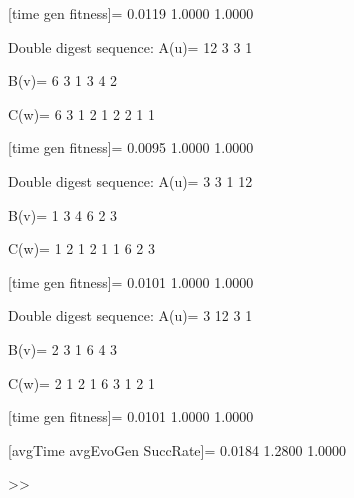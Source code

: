 [time gen fitness]=
    0.0119    1.0000    1.0000

Double digest sequence:
A(u)=
    12     3     3     1

B(v)=
     6     3     1     3     4     2

C(w)=
     6     3     1     2     1     2     2     1     1

[time gen fitness]=
    0.0095    1.0000    1.0000

Double digest sequence:
A(u)=
     3     3     1    12

B(v)=
     1     3     4     6     2     3

C(w)=
     1     2     1     2     1     1     6     2     3

[time gen fitness]=
    0.0101    1.0000    1.0000

Double digest sequence:
A(u)=
     3    12     3     1

B(v)=
     2     3     1     6     4     3

C(w)=
     2     1     2     1     6     3     1     2     1

[time gen fitness]=
    0.0101    1.0000    1.0000

[avgTime  avgEvoGen  SuccRate]=
    0.0184    1.2800    1.0000

>> 